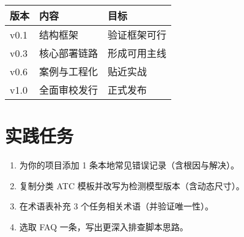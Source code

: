 \begin{longtable}[]{@{}lll@{}}
\toprule\noalign{}
版本 & 内容 & 目标 \\
\midrule\noalign{}
\endhead
\bottomrule\noalign{}
\endlastfoot
v0.1 & 结构框架 & 验证框架可行 \\
v0.3 & 核心部署链路 & 形成可用主线 \\
v0.6 & 案例与工程化 & 贴近实战 \\
v1.0 & 全面审校发行 & 正式发布 \\
\end{longtable}

\section{实践任务}\label{ux5b9eux8df5ux4efbux52a1}

\begin{enumerate}
\def\labelenumi{\arabic{enumi}.}
\tightlist
\item
  为你的项目添加 1 条本地常见错误记录（含根因与解决）。
\item
  复制分类 ATC 模板并改写为检测模型版本（含动态尺寸）。
\item
  在术语表补充 3 个任务相关术语（并验证唯一性）。
\item
  选取 FAQ 一条，写出更深入排查脚本思路。
\end{enumerate}
